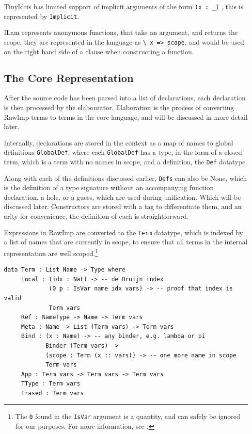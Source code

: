 \documentclass[a4paper]{article}
\begin{document}
TinyIdris has limited support of implicit arguments of the form
 \texttt{(x : \_)} , this is represented by \texttt{Implicit}.

ILam represents anonymous functions, that take an argument, and returns the
scope, they are represented in the language as \texttt{\textbackslash{} x => scope}, and would
be used on the right hand side of a clause when constructing a function.

\subsection{The Core Representation}
\label{sec:orgc03189c}

After the source code has been parsed into a list of declarations, each 
declaration is then processed by the elabourator. Elaboration is 
the process of converting RawImp terms to terms in the core language,
and will be discussed in more detail later. 

Internally, declarations are stored in the context as a map of names 
to global definitions \texttt{GlobalDef}, where each \texttt{GlobalDef} has a type, in the 
form of a closed term, which is a term with no names in scope, and a 
definition, the \texttt{Def} datatype.

Along with each of the definitions discussed earlier, \texttt{Defs} can also be
None, which is the definition of a type signature without an 
accompanying function declaration, a hole, or a guess, which are used 
during unification. Which will be discussed later. Constructors are
stored with a tag to differentiate them, and an arity for convenience,
the definition of each is straightforward.

Expressions in RawImp are converted to the \texttt{Term} datatype, which is 
indexed by a list of names that are currently in scope, to ensure that
all terms in the internal representation are well scoped.\footnote{The \texttt{0} found in the \texttt{IsVar} argument is a quantity, and can safely be ignored for our purposes. For more information, see .}

\begin{center}
\begin{verbatim}
data Term : List Name -> Type where
	 Local : (idx : Nat) -> -- de Bruijn index
			 (0 p : IsVar name idx vars) -> -- proof that index is valid
			 Term vars
	 Ref : NameType -> Name -> Term vars 
	 Meta : Name -> List (Term vars) -> Term vars
	 Bind : (x : Name) -> -- any binder, e.g. lambda or pi
			Binder (Term vars) ->
			(scope : Term (x :: vars)) -> -- one more name in scope
			Term vars
	 App : Term vars -> Term vars -> Term vars 
	 TType : Term vars
	 Erased : Term vars
\end{verbatim}
\end{center}
\end{document}
